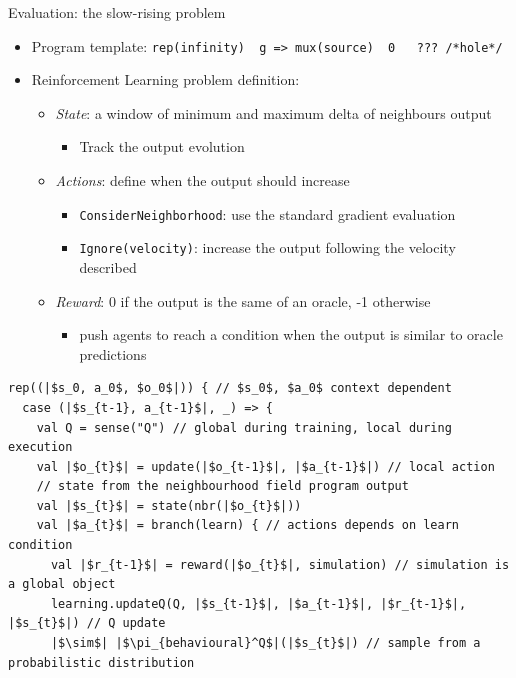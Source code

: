 \documentclass[8pt, aspectratio=169, handout]{beamer}
\begin{document}
\begin{frame}{Evaluation: the slow-rising problem}
\begin{card}
\begin{itemize}
      \item Program template: \texttt{rep(infinity) { g => mux(source) { 0 } { ??? /*hole*/ } }}
      \item Reinforcement Learning problem definition:
      \begin{itemize}
        \item \emph{State}: a window of minimum and maximum delta of neighbours output
        \begin{itemize}
          \item[\faArrowRight] Track the output evolution
        \end{itemize}
        \item \emph{Actions}: define when the output should increase
        \begin{itemize}
          \item[\faArrowRight] \texttt{ConsiderNeighborhood}: use the standard gradient evaluation
          \item[\faArrowRight] \texttt{Ignore(velocity)}: increase the output following the velocity described
        \end{itemize}
        \item \emph{Reward}: 0 if the output is the same of an oracle, -1 otherwise
        \begin{itemize}
          \item[\faArrowRight] push agents to reach a condition when the output is similar to oracle predictions
        \end{itemize}
      \end{itemize}
    \end{itemize}
  \end{card}
  \begin{card}
    \begin{verbatim}
rep((|$s_0, a_0$, $o_0$|)) { // $s_0$, $a_0$ context dependent 
  case (|$s_{t-1}, a_{t-1}$|, _) => {
    val Q = sense("Q") // global during training, local during execution
    val |$o_{t}$| = update(|$o_{t-1}$|, |$a_{t-1}$|) // local action
    // state from the neighbourhood field program output
    val |$s_{t}$| = state(nbr(|$o_{t}$|))
    val |$a_{t}$| = branch(learn) { // actions depends on learn condition
      val |$r_{t-1}$| = reward(|$o_{t}$|, simulation) // simulation is a global object
      learning.updateQ(Q, |$s_{t-1}$|, |$a_{t-1}$|, |$r_{t-1}$|, |$s_{t}$|) // Q update
      |$\sim$| |$\pi_{behavioural}^Q$|(|$s_{t}$|) // sample from a probabilistic distribution

\end{verbatim}
\end{card}
\end{frame}
\end{document}
